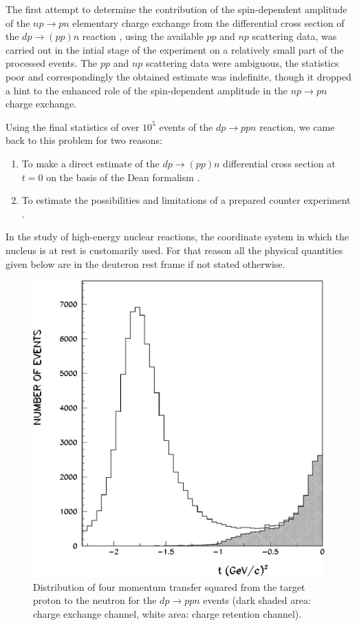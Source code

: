 \documentclass[epj]{svjour}
\begin{document}
The first attempt to determine the contribution of the spin-dependent amplitude
of the $np\to pn$ elementary charge exchange from the differential cross section
of the $dp\to (pp)n$ reaction \cite{Ala}, using the available $pp$ and $np$
scattering data, was carried out in the intial stage of the experiment on a
relatively small part of the processed events. The $pp$ and $np$ scattering data
were ambiguous, the statistics poor and correspondingly the obtained estimate
was indefinite, though it dropped a hint to the enhanced role of the
spin-dependent amplitude in the $np\to pn$ charge exchange.

Using the final statistics of over $10^{5}$ events of the $dp\to ppn$ reaction,
we came back to this problem for two reasons:
\begin{enumerate}
\item To make a direct estimate of the $dp\to (pp)n$ differential cross section
  at $t=0$ on the basis of the Dean formalism \cite{Dean1}.
\item To estimate the possibilities and limitations of a prepared counter
  experiment \cite{Baz}.
\end{enumerate}

In the study of high-energy nuclear reactions, the coordinate system in which
the nucleus is at rest is customarily used. For that reason all the physical
quantities given below are in the deuteron rest frame if not stated otherwise.

\begin{figure}
  \centering
  \includegraphics[width=0.82\columnwidth]{fig1.pdf}
  \caption{Distribution of four momentum transfer squared from the target proton
    to the neutron for the $dp\to ppn$ events (dark shaded area: charge exchange
    channel, white area: charge retention channel).}
\end{figure}
\end{document}
